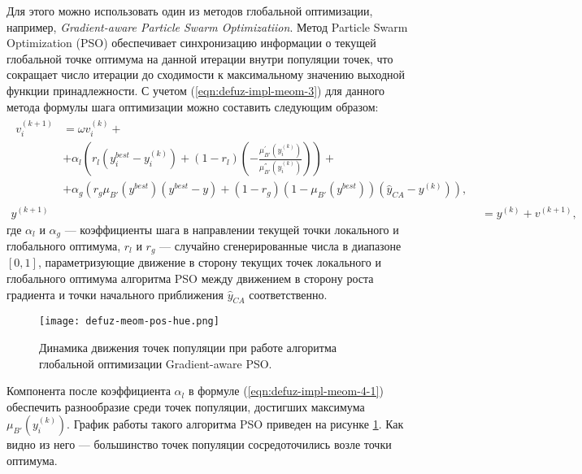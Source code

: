 Для этого можно использовать один из методов глобальной оптимизации, например, \textit{Gradient-aware Particle Swarm Optimizatiion}. Метод Particle Swarm Optimization (PSO) обеспечивает синхронизацию информации о текущей глобальной точке оптимума на данной итерации внутри популяции точек, что сокращает число итерации до сходимости к максимальному значению выходной функции принадлежности. С учетом (\ref{eqn:defuz-impl-meom-3}) для данного метода формулы шага оптимизации можно составить следующим образом:
\begin{align}
	\begin{split}
		v_i^{(k+1)} &= \omega v_i^{(k)} +\\
		&+ \alpha_l \left(
			r_l\left(
				y_i^{best} - y_i^{(k)}
			\right) + (1-r_l)\left(
				-\frac{\mu_{B'}^{'}(y_i^{(k)})}{\mu_{B'}^{''}(y_i^{(k)})}
			\right)
		\right) + \\
		&+ \alpha_g \left(
			r_g \mu_{B'}(y^{best})\left(
				y^{best}-y
			\right) + (1-r_g) \left(
				1-\mu_{B'}(y^{best})
			\right) \left(
				\hat{y}_{CA} - y^{(k)}
			\right)
		\right), \label{eqn:defuz-impl-meom-4-1}
	\end{split}\\
	y^{(k+1)} &= y^{(k)} + v^{(k+1)}, \nonumber
\end{align}
где $\alpha_l$ и $\alpha_g$ --- коэффициенты шага в направлении текущей точки локального и глобального оптимума, $r_l$ и $r_g$ --- случайно сгенерированные числа в диапазоне $[0,1]$, параметризующие движение в сторону текущих точек локального и глобального оптимума алгоритма PSO между движением в сторону роста градиента и точки начального приближения $\hat{y}_{CA}$ соответственно.

\begin{figure}[ht]
	\centering
	\texttt{[image: defuz-meom-pos-hue.png]}
	\caption{Динамика движения точек популяции при работе алгоритма глобальной оптимизации Gradient-aware PSO.}
	\label{fig:defuz-meom-pso-hue}
\end{figure}

Компонента после коэффициента $\alpha_l$ в формуле (\ref{eqn:defuz-impl-meom-4-1}) обеспечить разнообразие среди точек популяции, достигших максимума $\mu_{B'}(y_i^{(k)})$. График работы такого алгоритма PSO приведен на рисунке \cref{fig:defuz-meom-pso-hue}. Как видно из него --- большинство точек популяции сосредоточились возле точки оптимума.

